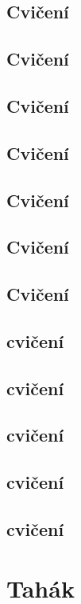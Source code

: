 \documentclass[a4paper,10pt]{book}
\begin{document}
	\section[3. Cvičení]{Cvičení}
 
	\section[4. Cvičení]{Cvičení}
 
	\section[5. Cvičení]{Cvičení}
 
	\section[6. Cvičení]{Cvičení}
 
	\section[7. Cvičení]{Cvičení}
 
	\section[8. Cvičení]{Cvičení}
 
	\section[9. Cvičení]{Cvičení}
 
	\section[10. cvičení]{cvičení}
 
	\section[11. cvičení]{cvičení}
 
	\section[12. cvičení]{cvičení}
 
	\section[13. cvičení]{cvičení}
 
	\section[14. cvičení]{cvičení}
 

\chapter{Tahák}
\end{document}
